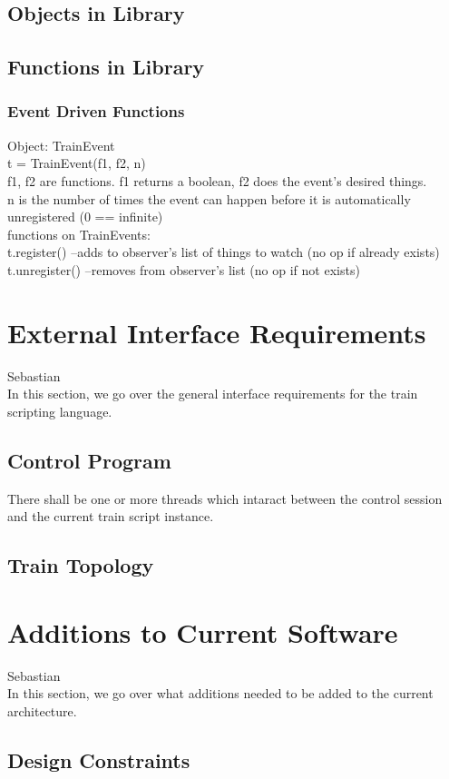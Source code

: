 \documentclass[a4paper,10pt,notitlepage]{article}
\begin{document}
\subsection{Objects in Library}
\subsection{Functions in Library}
\subsubsection{Event Driven Functions}
Object: TrainEvent
\\t = TrainEvent(f1, f2, n)
\\f1, f2 are functions. f1 returns a boolean, f2 does the event's desired things.
\\n is the number of times the event can happen before it is automatically unregistered (0 == infinite)
\\functions on TrainEvents:
\\t.register()	--adds to observer's list of things to watch (no op if already exists)
\\t.unregister()	--removes from observer's list (no op if not exists)

\section{External Interface Requirements}
Sebastian\\
    In this section, we go over the general interface requirements for the train scripting language.
\subsection{Control Program}
    There shall be one or more threads which intaract between the control session and the current train script instance.
\subsection{Train Topology}

\section{Additions to Current Software}
Sebastian \\
    In this section, we go over what additions needed to be added to the
    current architecture.
\subsection{Design Constraints}
\end{document}
